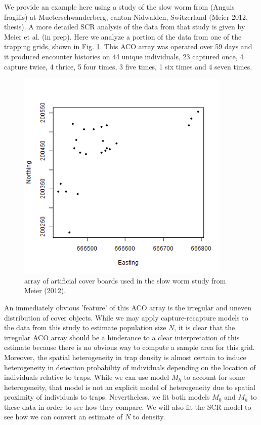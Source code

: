 \documentclass{book}
\begin{document}
We provide an example here using a study of the slow worm from (Anguis
fragilis) at Mueterschwanderberg, canton Nidwalden, Switzerland (Meier
2012, thesis). A more detailed SCR analysis of the data from that
study is given by Meier et al. (in prep). Here we analyze a portion of
the data from one of the trapping grids, shown in
Fig. \ref{fig.fig1}. This ACO array was operated over 59 days and it
produced encounter histories on 44 unique individuals, 23 captured
once, 4 capture twice, 4 thrice, 5 four times, 3 five times, 1 six
times and 4 seven times.
\begin{figure}[h]
\centering
\includegraphics[height=4in,width=4in]{traps.png}
\caption{
array of artificial cover boards used in the slow worm study from
Meier (2012). 
}
\label{fig.fig1}
\end{figure}
An immediately obvious 'feature' of this ACO array is the irregular
and uneven distribution of cover objects.  While we may apply
capture-recapture models to the data from this study to estimate
population size $N$, it is clear that the irregular ACO array should
be a hinderance to a clear interpretation of this estimate because
there is no obvious way to compute a sample area for this
grid. Moreover, the spatial heterogeneity in trap density is almost
certain to induce heterogeneity in detection probability of
individuals depending on the location of individuals relative to
traps. While we can use model $M_h$ to account for some heterogeneity,
that model is not an explicit model of heterogeneity due to spatial
proximity of individuals to traps. Nevertheless, we fit both models
$M_0$ and $M_h$ to these data in order to see how they compare.  We
will also fit the SCR model to see how we can convert an estimate of
$N$ to density. 
\end{document}
